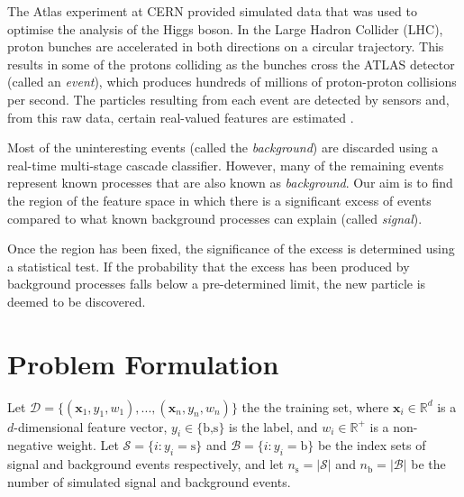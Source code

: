\documentclass[]{article}
\begin{document}
The Atlas experiment at CERN provided simulated data that was used to optimise the analysis of the Higgs boson. In the Large Hadron Collider (LHC), proton bunches are accelerated in both directions on a circular trajectory. This results in some of the protons colliding as the bunches cross the ATLAS detector (called an \textit{event}), which produces hundreds of millions of proton-proton collisions per second. The particles resulting from each event are detected by sensors and, from this raw data, certain real-valued features are estimated \cite{higgs-challenge}.

Most of the uninteresting events (called the \textit{background}) are discarded using a real-time multi-stage cascade classifier. However, many of the remaining events represent known processes that are also known as \textit{background}. Our aim is to find the region of the feature space in which there is a significant excess of events compared to what known background processes can explain (called \textit{signal}).

Once the region has been fixed, the significance of the excess is determined using a statistical test. If the probability that the excess has been produced by background processes falls below a pre-determined limit, the new particle is deemed to be discovered.




\section{Problem Formulation}

Let $\mathcal{D} = \{(\bm{x}_1, y_1,w_1),...,(\bm{x}_n,y_n,w_n)\}$ the the training set, where $\bm{x}_i \in \mathbb{R}^d$ is a $d$-dimensional feature vector, $y_i \in \{\text{b,s}\}$ is the label, and $w_i \in \mathbb{R}^+$ is a non-negative weight. Let $\mathcal{S} = \{i : y_i = \text{s}\}$ and $\mathcal{B} = \{i : y_i = \text{b}\}$ be the index sets of signal and background events respectively, and let $n_\text{s} = |\mathcal{S}|$ and $n_\text{b} = |\mathcal{B}|$ be the number of simulated signal and background events. 
\end{document}
